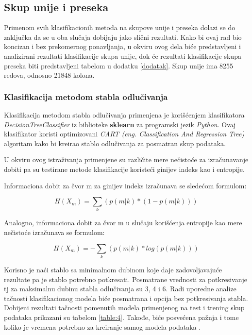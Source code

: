 \documentclass[a4paper]{article}
\begin{document}
\subsection{Skup unije i preseka}

Primenom svih klasifikacionih metoda na skupove unije i preseka dolazi se do zaključka da se u oba slučaja dobijaju jako slični rezultati. Kako bi ovaj rad bio koncizan i bez prekomernog ponavljanja, u okviru ovog dela biće predstavljeni i analizirani rezultati klasifikacije skupa unije, dok će rezultati klasifikacije skupa preseka biti predstavljeni tabelom u dodatku \ref{dodatak}. Skup unije ima 8255 redova, odnosno 21848 kolona.

\subsubsection{Klasifikacija metodom stabla odlučivanja}
\label{dt}

Klasifikacija metodom stabla odlučivanja primenjena je korišćenjem klasifikatora \textit{DecisionTreeClassifier} iz biblioteke \textbf{sklearn} za programski jezik \textit{Python}. Ovaj klasifikator koristi optimizovani \textit{CART (eng. Classification And Regression Tree)} algoritam kako bi kreirao stablo odlučivanja za posmatran skup podataka.

U okviru ovog istraživanja primenjene su različite mere nečistoće za izračunavanje dobiti pa su testirane metode klasifikacije koristeći ginijev indeks kao i entropije. 

Informaciona dobit za čvor m za ginijev indeks izračunava se sledećom formulom:

$$H(X_m) = \sum_{k}(p(m|k) * ( 1 - p(m|k) ))$$

Analogno, informaciona dobit za čvor m u slučaju korišćenja entropije kao mere nečistoće izračunava se formulom:

$$H(X_m) = -\sum_{k}(p(m|k) * log( p(m|k) ))$$

Korisno je naći stablo sa minimalnom dubinom koje daje zadovoljavajuće rezultate pa je stablo potrebno potkresati.
Posmatrane vrednosti za potkresivanje tj za maksimalnu dubinu stabla odlučivanja su 3, 4 i 6. Radi uporedne analize tačnosti klasifikacionog modela biće posmatrana i opcija bez potkresivanja stabla. Dobijeni rezultati tačnosti pomenutih modela primenjenog na test i trening skup podataka prikazani su tabelom \ref{table:4}.  Takođe, biće posvećena pažnja i tome koliko je vremena potrebno za kreiranje samog modela podataka \cite{classification}.
\end{document}
